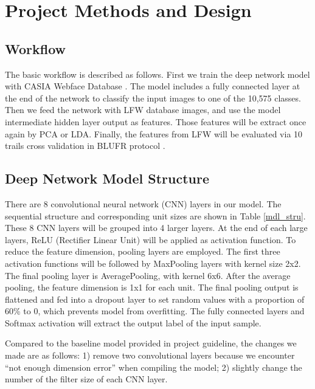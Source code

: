 \documentclass[conference]{IEEEtran}
\begin{document}
\section{Project Methods and Design}

\subsection{Workflow}

The basic workflow is described as follows. First we train the deep network model with CASIA Webface Database \cite{casia}. The model includes a fully connected layer at the end of the network to classify the input images to one of the 10,575 classes. Then we feed the network with LFW database images, and use the model intermediate hidden layer output as features. Those features will be extract once again by PCA or LDA. Finally, the features from LFW will be evaluated via 10 trails cross validation in BLUFR protocol \cite{yi2014learning}. 

\subsection{Deep Network Model Structure}

There are 8 convolutional neural network (CNN) \cite{lawrence1997face} layers in our model. The sequential structure and corresponding unit sizes are shown in Table \ref{mdl_stru}. These 8 CNN layers will be grouped into 4 larger layers. At the end of each large layers, ReLU (Rectifier Linear Unit) will be applied as activation function. To reduce the feature dimension, pooling layers are employed. The first three activation functions will be followed by MaxPooling layers with kernel size 2x2. The final pooling layer is AveragePooling, with kernel 6x6. After the average pooling, the feature dimension is 1x1 for each unit. The final pooling output is flattened and fed into a dropout layer to set random values with a proportion of 60\% to 0, which prevents model from overfitting. The fully connected layers and Softmax activation will extract the output label of the input sample.

Compared to the baseline model provided in project guideline, the changes we made are as follows: 1) remove two convolutional layers because we encounter ``not enough dimension error'' when compiling the model; 2) slightly change the number of the filter size of each CNN layer.
\end{document}
